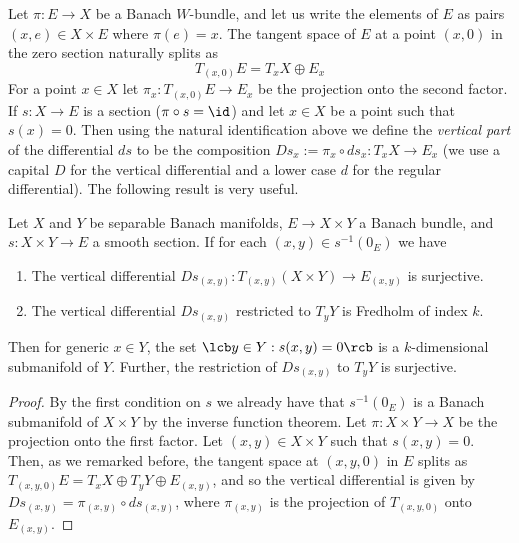 Let $\pi : E \rightarrow X$ be a Banach $W$-bundle, and let us write the elements of $E$ as pairs $(x,e) \in X \times E$ where $\pi(e)=x$. The tangent space of $E$ at a point $(x,0)$ in the zero section naturally splits as
\[ T_{(x,0)} E = T_x X \oplus E_x \]
For a point $x \in X$ let $\pi_x : T_{(x,0)} E \rightarrow E_x$ be the projection onto the second factor. If $s : X \rightarrow E$ is a section ($\pi \circ s = \id$) and let $x \in X$ be a point such that $s(x)=0$. Then using the natural identification above we define the \emph{vertical part} of the differential $ds$ to be the composition $Ds_x := \pi_x \circ ds_x : T_x X \rightarrow E_x$ (we use a capital $D$ for the vertical differential and a lower case $d$ for the regular differential). The following result is very useful.
\begin{thm}
\label{useful Banach bundle result}
Let $X$ and $Y$ be separable Banach manifolds, $E \rightarrow X \times Y$ a Banach bundle, and $s : X \times Y \rightarrow E$ a smooth section. If for each $(x,y) \in s^{-1}(0_E)$ we have
\begin{enumerate}
	\item The vertical differential $Ds_{(x,y)} : T_{(x,y)}(X \times Y) \rightarrow E_{(x,y)}$ is surjective.
	\item The vertical differential $Ds_{(x,y)}$ restricted to $T_y Y$ is Fredholm of index $k$.
\end{enumerate}
Then for generic $x \in Y$, the set $\lcb y \in Y : s(x,y)=0 \rcb$ is a $k$-dimensional submanifold of $Y$. Further, the restriction of $Ds_{(x,y)}$ to $T_y Y$ is surjective.
\end{thm}
\begin{proof}
By the first condition on $s$ we already have that $s^{-1}(0_E)$ is a Banach submanifold of $X \times Y$ by the inverse function theorem. Let $\pi : X \times Y \rightarrow X$ be the projection onto the first factor. Let $(x,y) \in X \times Y$ such that $s(x,y) = 0$. Then, as we remarked before, the tangent space at $(x,y,0)$ in $E$ splits as $T_{(x,y,0)} E = T_x X \oplus T_y Y \oplus E_{(x,y)}$, and so the vertical differential is given by $Ds_{(x,y)} = \pi_{(x,y)} \circ ds_{(x,y)}$, where $\pi_{(x,y)}$ is the projection of $T_{(x,y,0)}$ onto $E_{(x,y)}$. 

\unfinished


\end{proof}



